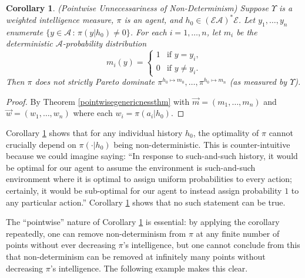 \documentclass[twoside]{article}
\newtheorem{corollary}[theorem]{Corollary}
\begin{document}
\begin{corollary}
\label{nondeterminismcorollary}
    (Pointwise Unnecessariness of Non-Determinism)
    Suppose $\Upsilon$ is a weighted intelligence measure, $\pi$ is an agent,
    and $h_0\in(\mathcal E\mathcal A)^*\mathcal E$.
    Let $y_1,\ldots,y_n$ enumerate $\{y\in\mathcal A\,:\,\pi(y|h_0)\not=0\}$.
    For each $i=1,\ldots,n$, let $m_i$ be the
    deterministic $\mathcal A$-probability distribution
    \[
        m_i(y) = \begin{cases}
            1 &\mbox{if $y=y_i$,}\\
            0 &\mbox{if $y\not=y_i$.}
        \end{cases}
    \]
    Then $\pi$ does not strictly Pareto dominate
    $\pi^{h_0\mapsto m_0},\ldots,\pi^{h_0\mapsto m_n}$
    (as measured by $\Upsilon$).
\end{corollary}

\begin{proof}
    By Theorem \ref{pointwisegenericnessthm} with
    $\vec m=(m_1,\ldots,m_n)$ and $\vec w=(w_1,\ldots,w_n)$ where each
    $w_i=\pi(a_i|h_0)$.
\end{proof}

Corollary \ref{nondeterminismcorollary} shows that for any individual
history $h_0$, the optimality of $\pi$ cannot crucially depend on $\pi(\cdot|h_0)$
being non-deterministic. This is counter-intuitive because we could imagine saying:
``In response to such-and-such history, it would be optimal for our agent
to assume the environment is such-and-such environment where it is optimal to
assign uniform probabilities to every action;
certainly, it would be sub-optimal for our agent to instead assign probability $1$ to
any particular action.'' Corollary \ref{nondeterminismcorollary} shows
that no such statement can be true.

The ``pointwise'' nature of Corollary \ref{nondeterminismcorollary}
is essential: by applying the corollary repeatedly, one can remove non-determinism
from $\pi$ at any finite number of points without ever decreasing $\pi$'s intelligence,
but one cannot conclude from this that non-determinism can be removed at infinitely
many points without decreasing $\pi$'s intelligence. The following example makes this
clear.
\end{document}
